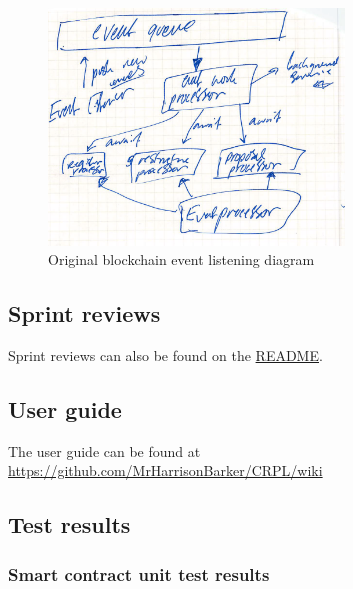 \begin{figure}[H]
\caption{Original blockchain event listening diagram}
\centering
\includegraphics[width=0.7\textwidth,height=\textheight,keepaspectratio]{images/appendix/design/docs/event}
\end{figure}

\subsection{Sprint reviews}

Sprint reviews can also be found on the \href{https://github.com/mrharrisonbarker/crpl#readme}{README}.



\subsection{User guide}

The user guide can be found at \href{https://github.com/MrHarrisonBarker/CRPL/wiki}{https://github.com/MrHarrisonBarker/CRPL/wiki}

\subsection{Test results}
\label{sec:test-results}

\subsubsection{Smart contract unit test results}
\label{sec:test-results:smart}

